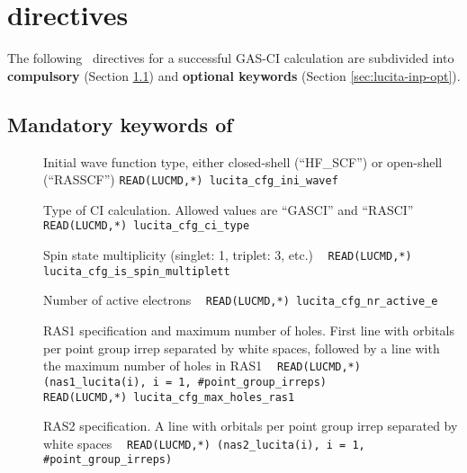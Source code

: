 \section{ directives}\label{sec:lucita-inp}

          The following \ directives for a successful GAS-CI calculation 
are subdivided into {\bf{compulsory}} (Section \ref{sec:lucita-inp-mand}) 
and {\bf{optional keywords}} (Section \ref{sec:lucita-inp-opt}). 

\subsection{Mandatory keywords of }\label{sec:lucita-inp-mand}

\begin{description}
\item[] Initial wave function type, either closed-shell (``HF\_SCF'') or open-shell (``RASSCF'') 
\verb|READ(LUCMD,*) lucita_cfg_ini_wavef |

\item[] Type of CI calculation. Allowed values are ``GASCI'' and ``RASCI'' \verb| |\newline
\verb|READ(LUCMD,*) lucita_cfg_ci_type |

\item[] Spin state multiplicity (singlet: 1, triplet: 3, etc.) \verb| |\newline
\verb|READ(LUCMD,*) lucita_cfg_is_spin_multiplett |


\vspace{0.75cm}


\item[] Number of active electrons \verb| |\newline
\verb|READ(LUCMD,*) lucita_cfg_nr_active_e |

\item[] RAS1 specification and maximum number of holes. 
First line with orbitals per point group irrep separated by white spaces, 
followed by a line with the maximum number of holes in RAS1 \verb| |\newline
\verb|READ(LUCMD,*) (nas1_lucita(i), i = 1, #point_group_irreps) |\\
\verb|READ(LUCMD,*) lucita_cfg_max_holes_ras1 |

\item[] RAS2 specification. A line with orbitals per point group irrep separated by white spaces \verb| |\newline
\verb|READ(LUCMD,*) (nas2_lucita(i), i = 1, #point_group_irreps) |


\end{description}

